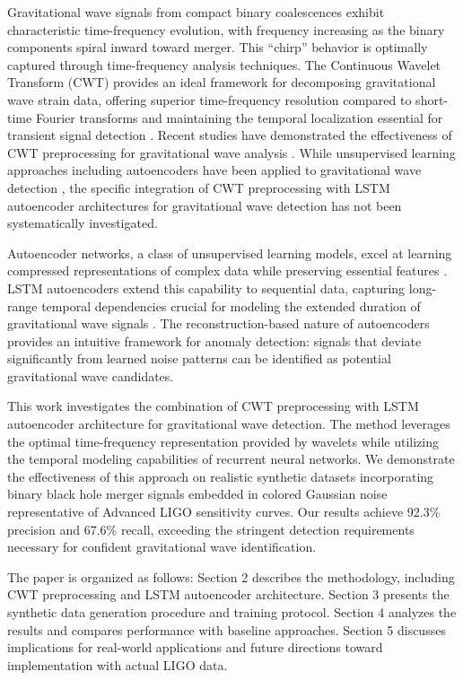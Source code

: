 \documentclass{iopjournal}
\begin{document}
Gravitational wave signals from compact binary coalescences exhibit characteristic time-frequency evolution, with frequency increasing as the binary components spiral inward toward merger. This ``chirp'' behavior is optimally captured through time-frequency analysis techniques. The Continuous Wavelet Transform (CWT) provides an ideal framework for decomposing gravitational wave strain data, offering superior time-frequency resolution compared to short-time Fourier transforms and maintaining the temporal localization essential for transient signal detection \cite{chatterji2004multiresolution}. Recent studies have demonstrated the effectiveness of CWT preprocessing for gravitational wave analysis \cite{powell2015classification}. While unsupervised learning approaches including autoencoders have been applied to gravitational wave detection \cite{torres2024anomaly, lopez2022deep}, the specific integration of CWT preprocessing with LSTM autoencoder architectures for gravitational wave detection has not been systematically investigated.

Autoencoder networks, a class of unsupervised learning models, excel at learning compressed representations of complex data while preserving essential features \cite{hinton2006reducing}. LSTM autoencoders extend this capability to sequential data, capturing long-range temporal dependencies crucial for modeling the extended duration of gravitational wave signals \cite{hochreiter1997long}. The reconstruction-based nature of autoencoders provides an intuitive framework for anomaly detection: signals that deviate significantly from learned noise patterns can be identified as potential gravitational wave candidates.

This work investigates the combination of CWT preprocessing with LSTM autoencoder architecture for gravitational wave detection. The method leverages the optimal time-frequency representation provided by wavelets while utilizing the temporal modeling capabilities of recurrent neural networks. We demonstrate the effectiveness of this approach on realistic synthetic datasets incorporating binary black hole merger signals embedded in colored Gaussian noise representative of Advanced LIGO sensitivity curves. Our results achieve 92.3\% precision and 67.6\% recall, exceeding the stringent detection requirements necessary for confident gravitational wave identification.

The paper is organized as follows: Section 2 describes the methodology, including CWT preprocessing and LSTM autoencoder architecture. Section 3 presents the synthetic data generation procedure and training protocol. Section 4 analyzes the results and compares performance with baseline approaches. Section 5 discusses implications for real-world applications and future directions toward implementation with actual LIGO data.
\end{document}
